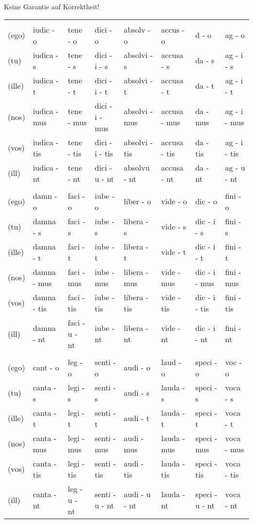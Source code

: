 \documentclass[a4paper, landscape]{article}
\begin{document}
\begin{landscape}
\begin{table}[]
	\begin{center}
		Keine Garantie auf Korrektheit! \\
	\end{center}
\begin{tabular}{llllllll}
	& & & &  &  &  & \\
	(ego)	& iudic - o		& tene - o		& dici - o			& absolv - o	 & accus  - o   & d -  o		& ag - o \\ 
	(tu)	& iudica - s	& tene - s		& dici - i - s		& absolvi - s    & accusa - s   & da - s		& ag - i - s \\
	(ille)	& iudica - t	& tene - t		& dici - i - t		& absolvi - t    & accusa - t   & da - t		& ag - i - t \\
	(nos)	& iudica - mus	& tene - mus	& dici - i - mus	& absolvi - mus & accusa - mus & da - mus		& ag - i - mus \\
	(vos)	& iudica - tis	& tene - tis	& dici - i - tis	& absolvi - tis  & accusa - tis & da - tis		& ag - i - tis \\
	(ill)	& iudica - nt	& tene - nt		& dici - u - nt		& absolvu - nt	 & accusa - nt  & da - nt		& ag - u - nt \\
	& & & &  &  &  & \\
	(ego)	& damn	- o		& faci - o		& iube - o 	 & liber  - o   & vide - o   & dic     - o	 & fini - o  \\ 
	(tu)	& damna - s		& faci - s		& iube - s	 & libera - s   & vide - s	 & dic - i - s	 & fini - s \\
	(ille)	& damna - t		& faci - t		& iube - t	 & libera - t   & vide - t	 & dic - i - t 	 & fini - t  \\
	(nos)	& damna - mus	& faci - mus	& iube - mus & libera - mus & vide - mus & dic - i - mus & fini - mus \\
	(vos)	& damna - tis	& faci - tis	& iube - tis & libera - tis & vide - tis & dic - i - tis & fini - tis \\
	(ill)	& damna - nt	& faci - u - nt	& iube - nt	 & libera - nt  & vide - nt  & dic - i - nt	 & fini - nt \\
	& & & &  &  &  & \\

	(ego)	& cant  - o		& leg -  o		& senti - o		& audi - o		& laud - o		& speci - o		 & voc - o \\
	(tu)	& canta - s		& legi - s		& senti - s		& audi - s		& lauda - s		& speci - s		 & voca - s \\
	(ille)	& canta - t		& legi - t		& senti - t		& audi - t		& lauda - t		& speci - t		 & voca - t \\
	(nos)	& canta - mus	& legi - mus	& senti - mus	& audi - mus	& lauda - mus	& speci - mus	 & voca - mus \\
	(vos)	& canta - tis	& legi - tis	& senti - tis	& audi - tis	& lauda - tis	& speci - tis	 & voca - tis \\
	(ill)	& canta - nt	& leg - u - nt	& senti - u - nt& audi - u - nt & lauda - nt	& speci - u - nt & voca - nt \\
	

\end{tabular}
\end{table}
\end{landscape}
\end{document}
